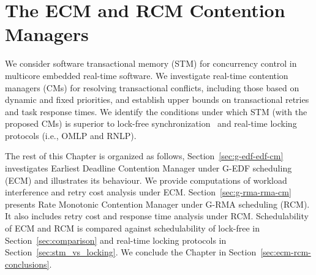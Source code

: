 \chapter{\label{ecm-rcm}The ECM and RCM Contention Managers}
%
We consider software transactional memory (STM) for concurrency control in multicore embedded real-time software. We investigate real-time contention managers (CMs) for resolving transactional conflicts, including those based on dynamic and fixed priorities, and establish upper bounds on transactional retries and task response times. We identify the conditions under which STM (with the proposed CMs) is superior to lock-free synchronization~\cite{key-5} and real-time locking protocols (i.e., OMLP\cite{springerlink:10.1007/s10617-012-9090-1,key-3} and RNLP\cite{6257574}).

The rest of this Chapter is organized as follows, Section~\ref{sec:g-edf-edf-cm} investigates Earliest Deadline Contention Manager under G-EDF scheduling (ECM) and illustrates its behaviour. We provide computations of workload interference and retry cost analysis under ECM. Section~\ref{sec:g-rma-rma-cm} presents Rate Monotonic Contention Manager under G-RMA scheduling (RCM). It also includes retry cost and response time analysis under RCM. Schedulability of ECM and RCM is compared against schedulability of lock-free in Section~\ref{sec:comparison} and real-time locking protocols in Section~\ref{sec:stm_vs_locking}. We conclude the Chapter in Section~\ref{sec:ecm-rcm-conclusions}.
%
